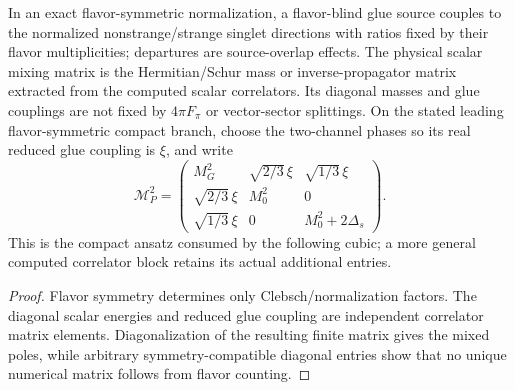 \documentclass[12pt,a4paper]{article}
\begin{document}
\begin{theorem}
\label{p11:thm:compact-scalar-glue-singlet-mixing}

In an exact flavor-symmetric normalization, a flavor-blind glue source couples to the normalized nonstrange/strange singlet directions with ratios fixed by their flavor multiplicities; departures are source-overlap effects.  The physical scalar mixing matrix is the Hermitian/Schur mass or inverse-propagator matrix extracted from the computed scalar correlators.  Its diagonal masses and glue couplings are not fixed by \(4\pi F_\pi\) or vector-sector splittings.
On the stated leading flavor-symmetric compact branch, choose the
two-channel phases so its real reduced glue coupling is $\xi$, and write
\begin{equation}
\label{p11:eq:compact-scalar-mixing-block}
 \mathcal M_P^2=
 \begin{pmatrix}
 M_G^2&\sqrt{2/3}\,\xi&\sqrt{1/3}\,\xi\\
 \sqrt{2/3}\,\xi&M_0^2&0\\
 \sqrt{1/3}\,\xi&0&M_0^2+2\Delta_s
 \end{pmatrix}.
\end{equation}
This is the compact ansatz consumed by the following cubic; a more general
computed correlator block retains its actual additional entries.
\label{p11:eq:xi-native-transfer}
\end{theorem}
\begin{proof}

Flavor symmetry determines only Clebsch/normalization factors.  The diagonal scalar energies and reduced glue coupling are independent correlator matrix elements.  Diagonalization of the resulting finite matrix gives the mixed poles, while arbitrary symmetry-compatible diagonal entries show that no unique numerical matrix follows from flavor counting.
\end{proof}
\end{document}
